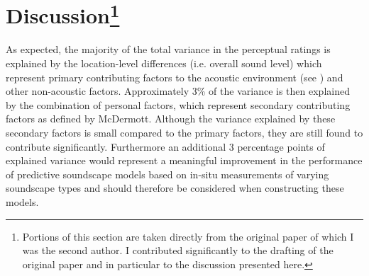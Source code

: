 \section[Discussion]{Discussion\footnote{Portions of this section are taken directly from the original paper \citep{Erfanian2021Psychological} of which I was the second author. I contributed significantly to the drafting of the original paper and in particular to the discussion presented here.}}


As expected, the majority of the total variance in the perceptual ratings is explained by the location-level differences (i.e. overall sound level) which represent primary contributing factors to the acoustic environment (see \citep{McDermott2012Auditory}) and other non-acoustic factors. Approximately 3\% of the variance is then explained by the combination of personal factors, which represent secondary contributing factors as defined by McDermott. Although the variance explained by these secondary factors is small compared to the primary factors, they are still found to contribute significantly. Furthermore an additional 3 percentage points of explained variance would represent a meaningful improvement in the performance of predictive soundscape models based on in-situ measurements of varying soundscape types \citep{Lionello2020systematic} and should therefore be considered when constructing these models. 

